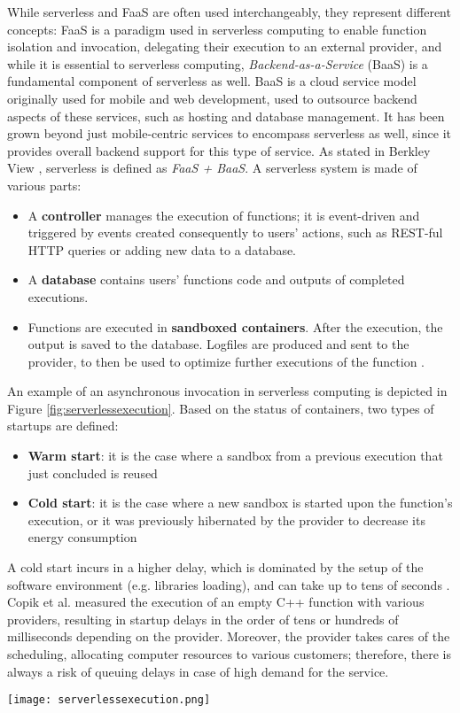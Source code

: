 \documentclass[
	a4paper, %
	12pt,
	twoside, %
]{LTJournalArticle}
\begin{document}
While serverless and FaaS are often used interchangeably, they represent different concepts: FaaS is a paradigm used in serverless computing to enable function isolation and invocation, delegating their execution to an external provider, and while it is essential to serverless computing, \textit{Backend-as-a-Service} (BaaS) is a fundamental component of serverless as well. BaaS is a cloud service model originally used for mobile and web development, used to outsource backend aspects of these services, such as hosting and database management. It has been grown beyond just mobile-centric services to encompass serverless as well, since it provides overall backend support for this type of service. As stated in Berkley View \cite{jonas_cloud_2019}, serverless is defined as \textit{FaaS + BaaS}. A serverless system is made of various parts:

\begin{itemize}
	\item A \textbf{controller} manages the execution of functions; it is event-driven and triggered by events created consequently to users' actions, such as REST-ful HTTP queries or adding new data to a database.
	\item A \textbf{database} contains users' functions code and outputs of completed executions.
	\item Functions are executed in \textbf{sandboxed containers}. After the execution, the output is saved to the database. Logfiles are produced and sent to the provider, to then be used to optimize further executions of the function \cite{shafiei_serverless_2022}.
\end{itemize}
An example of an asynchronous invocation in serverless computing is depicted in Figure \ref{fig:serverlessexecution}. Based on the status of containers, two types of startups are defined:
\begin{itemize}
	\item \textbf{Warm start}: it is the case where a sandbox from a previous execution that just concluded is reused
	\item \textbf{Cold start}: it is the case where a new sandbox is started upon the function's execution, or it was previously hibernated by the provider to decrease its energy consumption
\end{itemize}
A cold start incurs in a higher delay, which is dominated by the setup of the software environment (e.g. libraries loading), and can take up to tens of seconds \cite{jonas_cloud_2019}. Copik et al. \cite{copik_rfaas_2023} measured the execution of an empty C++ function with various providers, resulting in startup delays in the order of tens or hundreds of milliseconds depending on the provider. Moreover, the provider takes cares of the scheduling, allocating computer resources to various customers; therefore, there is always a risk of queuing delays in case of high demand for the service.
\begin{figure*}[!htb]
	\texttt{[image: serverlessexecution.png]}
	\caption{Example of an asynchronous invocation. Source: \cite{li_serverless_2022}}
	\label{fig:serverlessexecution}
\end{figure*}
\end{document}
